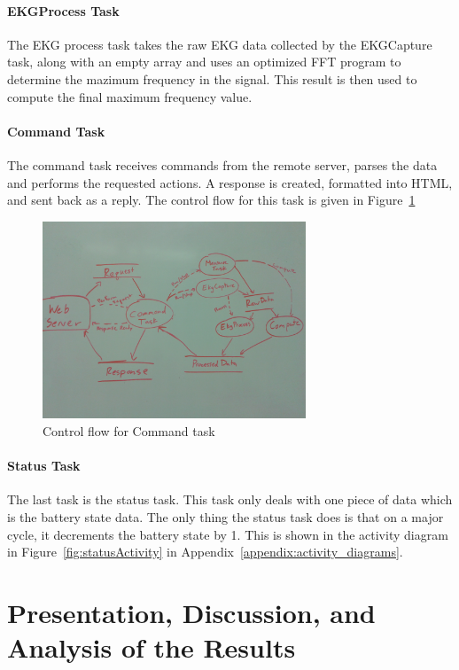 \documentclass[12pt]{article} %
\begin{document}
\paragraph{EKGProcess Task} The EKG process task takes the raw EKG data collected by the EKGCapture task, along with an empty array and uses an optimized FFT program to determine the mazimum frequency in the signal. This result is then used to compute the final maximum frequency value.

\paragraph{Command Task} The command task receives commands from the remote server, parses the data and performs the requested actions. A response is created, formatted into HTML, and sent back as a reply. The control flow for this task is given in Figure~\ref{fig:remote_control}

\begin{figure}[h]
	\centering
	\includegraphics[width=0.7\textwidth]{../design/internet_control_flow.jpg}
	\caption{Control flow for Command task}
	\label{fig:remote_control}
\end{figure}

    \paragraph{Status Task}
    The last task is the status task. This task only deals with one piece of data
    which is the battery state data. The only thing the status task does is that on
    a major cycle, it decrements the battery state by 1. This is shown in the
		activity diagram in Figure~\ref{fig:statusActivity} in Appendix~\ref{appendix:activity_diagrams}.

    \section{Presentation, Discussion, and Analysis of the Results}
\end{document}

